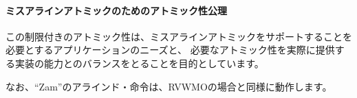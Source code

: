 \vspace{-0.2in}
\begin{comment}
\paragraph{Atomicity Axiom for misaligned atomics}
\end{comment}
\paragraph{ミスアラインアトミックのためのアトミック性公理}
\label{rvwmo:ax:misaligned}
\misalignedatomicityaxiom

\begin{comment}
This restricted form of atomicity is intended to balance the needs of applications which require support for misaligned atomics and the ability of the implementation to actually provide the necessary degree of atomicity.
\end{comment}
この制限付きのアトミック性は、ミスアラインアトミックをサポートすることを必要とするアプリケーションのニーズと、
必要なアトミック性を実際に提供する実装の能力とのバランスをとることを目的としています。

\begin{comment}
Aligned instructions under ``Zam'' continue to behave as they normally do under RVWMO.
\end{comment}
なお、``Zam''のアラインド・命令は、RVWMOの場合と同様に動作します。

